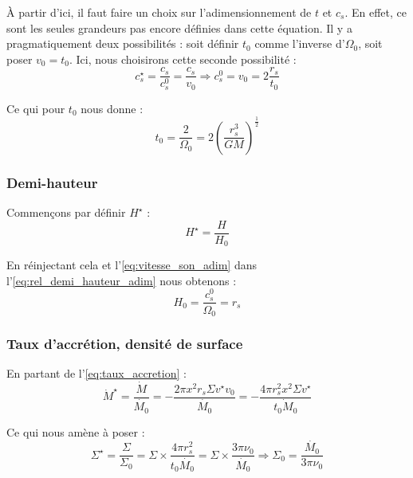 À partir d’ici, il faut faire un choix sur l’adimensionnement de $t$ et $c_s$.
En effet, ce sont les seules grandeurs pas encore définies dans cette équation.
Il y a pragmatiquement deux possibilités : soit définir $t_0$ comme l’inverse
d’$\Omega_0$, soit poser $v_0 = t_0$. Ici, nous choisirons cette seconde
possibilité :
\begin{equation}
    \label{eq:vitesse_son_adim}
    c_s^\star = \frac{c_s}{c_s^0} = \frac{c_s}{v_0} \Rightarrow c_s^0 = v_0 = 2 \frac{r_s}{t_0}
\end{equation}

Ce qui pour $t_0$ nous donne :
\begin{equation}
    t_0 = \frac{2}{\Omega_0} = 2 \left( \frac{r_s^3}{G M} \right)^\frac{1}{2}
\end{equation}    

\subsubsection{Demi-hauteur}

Commençons par définir $H^\star$ :
\begin{equation}
    H^\star = \frac{H}{H_0}
\end{equation}

En réinjectant cela et l’\cref{eq:vitesse_son_adim} dans
l’\cref{eq:rel_demi_hauteur_adim} nous obtenons :
\begin{equation}
    \label{eq:demi_hauteur_adim}
    H_0 = \frac{c_s^0}{\Omega_0} = r_s
\end{equation}

\subsubsection{Taux d’accrétion, densité de surface}

En partant de l’\cref{eq:taux_accretion} :
\begin{equation}
    \dot{M}^\star = \frac{\dot{M}}{\dot{M_0}} = - \frac{2 \pi x^2 r_s \Sigma v^\star v_0}{\dot{M_0}} = - \frac{4 \pi r_s^2 x^2 \Sigma v^\star}{\dot{t_0 M_0}}
\end{equation}

Ce qui nous amène à poser :
\begin{equation}
    \label{eq:densite_surface_adim}
    \Sigma^\star = \frac{\Sigma}{\Sigma_0} = \Sigma \times \frac{4 \pi r_s^2}{t_0 \dot{M_0}} = \Sigma \times \frac{3 \pi \nu_0}{\dot{M_0}} \Rightarrow \Sigma_0 = \frac{\dot{M_0}}{3 \pi \nu_0}
\end{equation}


